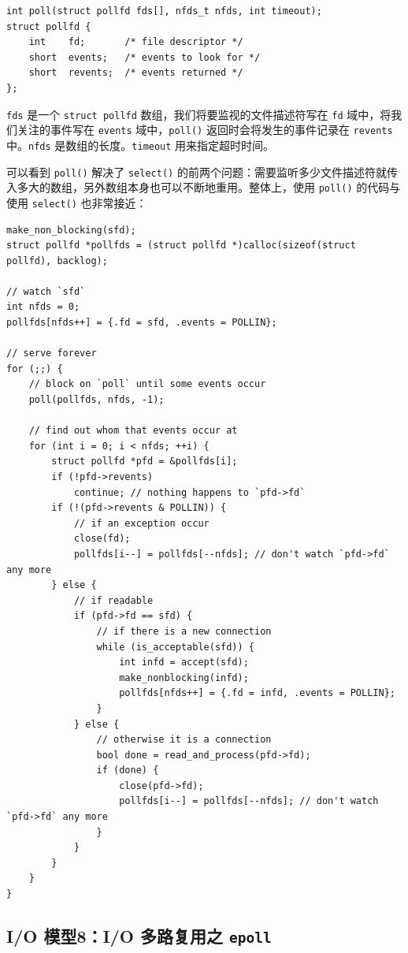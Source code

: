 \documentclass[a4paper]{article}
\begin{document}
\begin{verbatim}
int poll(struct pollfd fds[], nfds_t nfds, int timeout);
struct pollfd {
    int    fd;       /* file descriptor */
    short  events;   /* events to look for */
    short  revents;  /* events returned */
};
\end{verbatim}

\texttt{fds} 是一个 \texttt{struct\ pollfd} 数组，我们将要监视的文件描述符写在 \texttt{fd} 域中，将我们关注的事件写在 \texttt{events} 域中，\texttt{poll()} 返回时会将发生的事件记录在 \texttt{revents} 中。\texttt{nfds} 是数组的长度。\texttt{timeout} 用来指定超时时间。

可以看到 \texttt{poll()} 解决了 \texttt{select()} 的前两个问题：需要监听多少文件描述符就传入多大的数组，另外数组本身也可以不断地重用。整体上，使用 \texttt{poll()} 的代码与使用 \texttt{select()} 也非常接近：

\begin{verbatim}
make_non_blocking(sfd);
struct pollfd *pollfds = (struct pollfd *)calloc(sizeof(struct pollfd), backlog);

// watch `sfd`
int nfds = 0;
pollfds[nfds++] = {.fd = sfd, .events = POLLIN};

// serve forever
for (;;) {
    // block on `poll` until some events occur
    poll(pollfds, nfds, -1);

    // find out whom that events occur at
    for (int i = 0; i < nfds; ++i) {
        struct pollfd *pfd = &pollfds[i];
        if (!pfd->revents)
            continue; // nothing happens to `pfd->fd`
        if (!(pfd->revents & POLLIN)) {
            // if an exception occur
            close(fd);
            pollfds[i--] = pollfds[--nfds]; // don't watch `pfd->fd` any more
        } else {
            // if readable
            if (pfd->fd == sfd) {
                // if there is a new connection
                while (is_acceptable(sfd)) {
                    int infd = accept(sfd);
                    make_nonblocking(infd);
                    pollfds[nfds++] = {.fd = infd, .events = POLLIN};
                }
            } else {
                // otherwise it is a connection
                bool done = read_and_process(pfd->fd);
                if (done) {
                    close(pfd->fd);
                    pollfds[i--] = pollfds[--nfds]; // don't watch `pfd->fd` any more
                }
            }
        }
    }
}
\end{verbatim}

\subsection{I/O 模型8：I/O 多路复用之 \texttt{epoll}}
\end{document}
